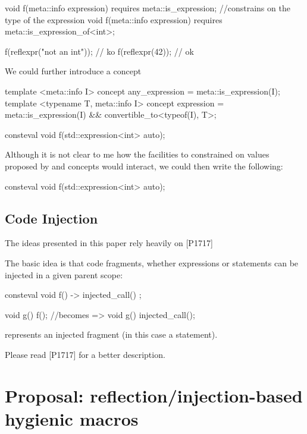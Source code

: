 \documentclass{wg21}
\begin{document}
\begin{codeblock}
void f(meta::info expression) requires meta::is_expression;
//constrains on the type of the expression
void f(meta::info expression) requires meta::is_expression_of<int>;

f(reflexpr("not an int")); // ko
f(reflexpr(42)); // ok
\end{codeblock}

We could further introduce a  concept

\begin{codeblock}
template <meta::info I>
concept any_expression = meta::is_expression(I);
template <typename T, meta::info I>
concept expression = meta::is_expression(I) && convertible_to<typeof(I), T>;
\end{codeblock}


\begin{codeblock}
consteval void f(std::expression<int> auto);
\end{codeblock}

Although it is not clear to me how the facilities to constrained on values proposed by \cite{P1240R1} and concepts
would interact, we could then write the following:

\begin{codeblock}
consteval void f(std::expression<int> auto);
\end{codeblock}

\subsection{Code Injection}

The ideas presented in this paper rely heavily on [P1717] \cite{P1717R0}

The basic idea is that code fragments, whether expressions or statements can be injected in a given parent scope:

\begin{codeblock}
consteval void f() {
    -> { injected_call() };
}

void g() {
    f();
}
//becomes =>
void g() {
    injected_call();
}

\end{codeblock}

 represents an injected fragment (in this case a statement).

Please read [P1717] \cite{P1717R0} for a better description.

\section{Proposal: reflection/injection-based hygienic macros}
\end{document}

